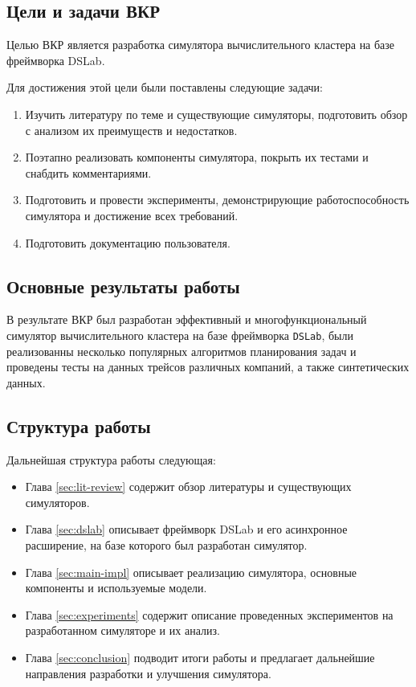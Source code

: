 \subsection{Цели и задачи ВКР}

Целью ВКР является разработка симулятора вычислительного кластера на базе фреймворка DSLab. 

Для достижения этой цели были поставлены следующие задачи: 
\begin{enumerate}
\item  Изучить литературу по теме и существующие симуляторы, подготовить обзор с анализом их преимуществ и недостатков.
\item Поэтапно реализовать компоненты симулятора, покрыть их тестами и снабдить комментариями.
\item Подготовить и провести эксперименты, демонстрирующие работоспособность симулятора и достижение всех требований.
\item Подготовить документацию пользователя.
\end{enumerate}

\subsection{Основные результаты работы}

В результате ВКР был разработан эффективный и многофункциональный симулятор вычислительного кластера на базе фреймворка \texttt{DSLab}, были реализованны несколько популярных алгоритмов планирования задач и проведены тесты на данных трейсов различных компаний, а также синтетических данных. 


\subsection{Структура работы}

Дальнейшая структура работы следующая: 
\begin{itemize}
    \item Глава \ref{sec:lit-review} содержит обзор литературы и существующих симуляторов.
    \item Глава \ref{sec:dslab} описывает фреймворк DSLab и его асинхронное расширение, на базе которого был разработан симулятор.
    \item Глава \ref{sec:main-impl} описывает реализацию симулятора, основные компоненты и используемые модели.
    \item Глава \ref{sec:experiments} содержит описание проведенных экспериментов на разработанном симуляторе и их анализ.
    \item Глава \ref{sec:conclusion} подводит итоги работы и предлагает дальнейшие направления разработки и улучшения симулятора.
\end{itemize} 


